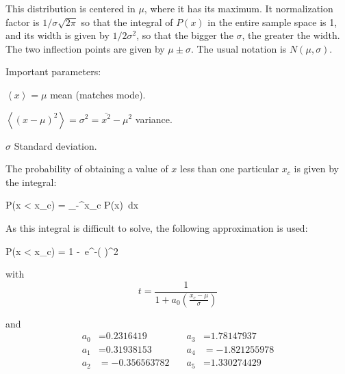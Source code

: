 This distribution is centered in $\mu$, where it has its maximum. It normalization factor is $1/\sigma\sqrt{2\pi}$ so that the integral of $P(x)$ in the entire sample space is 1, and its width is given by $1/2\sigma^2$, so that the bigger the $\sigma$, the greater the width. The two inflection points are given by $\mu \pm \sigma$. The usual notation is $N(\mu, \sigma)$.

Important parameters:
	\bi
		\item $\left\langle x \right\rangle = \mu$ mean (matches mode).
		\item $\left\langle(x - \mu)^2\right\rangle = \sigma^2 = \bar{x^2} - \mu^2$ variance.
		\item $\sigma$ Standard deviation.
	\ei

The probability of obtaining a value of $x$ less than one particular $x_c$ is given by the integral:

	\be P(x < x_c) = \int_{-\infty}^{x_c} P(x) \,dx \ee

As this integral is difficult to solve, the following approximation is used:

	\be P(x < x_c) = 1 -  \,e^{-\left( \right)^2} \left[ a_1t + a_2t^2 + a_3t^3 + a_4t^4 + a_5t^5\right] \ee\vfill

\bc
\begin{minipage}[t]{.4\textwidth}
	\bc with\ec
	\begin{equation*}
		t = \frac{1}{1 + a_0 \left(\frac{x_c - \mu}{\sigma}\right)}
	\end{equation*}
\end{minipage}%
\begin{minipage}[t]{.6\textwidth}
	\bc and\ec
	\begin{equation*}
		\begin{split}
			a_0 &= \text{0.2316419}   \\
			a_1 &= \text{0.31938153}  \\
			a_2 &= -\text{0.356563782}\\
		\end{split}\quad
		\begin{split}
			a_3 &= \text{1.78147937}  \\
			a_4 &= -\text{1.821255978}\\
			a_5 &= \text{1.330274429} \\
		\end{split}
	\end{equation*}
\end{minipage}
\ec

